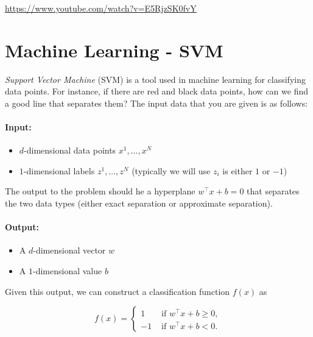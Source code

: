 \begin{resource}
\url{https://www.youtube.com/watch?v=E5RjzSK0fvY}
\end{resource}



\section{Machine Learning - SVM}



\emph{Support Vector Machine} (SVM) is a tool used in machine learning for classifying data points.   For instance, if there are red and black data points, how can we find a good line that separates them?  The input data that you are given is as follows:

\paragraph{Input:}
\begin{itemize}
\item $d$-dimensional data points $x^1, \dots, x^N$ 
\item $1$-dimensional labels $z^1, \dots, z^N$  (typically we will use $z_i$ is either $1$  or $-1$)
\end{itemize}

The output to the problem should he a hyperplane $w^\top x + b = 0$ that separates the two data types (either exact separation or approximate separation).

\paragraph{Output:}
\begin{itemize}
\item A $d$-dimensional vector $w$
\item A $1$-dimensional value $b$
\end{itemize}

Given this output, we can construct a classification function $f(x)$ as 

\begin{equation}
f(x) = \begin{cases}
1 & \text{ if } w^\top x + b \geq 0,\\
-1 & \text{ if } w^\top x + b < 0.
\end{cases}
\end{equation}





